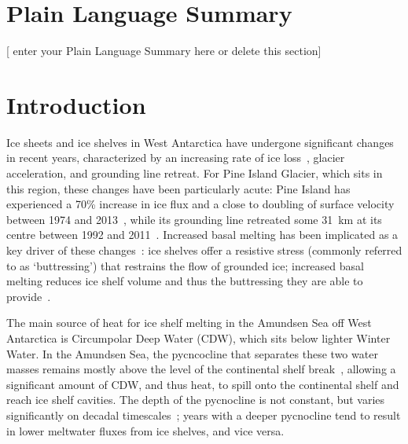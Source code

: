 \documentclass[draft]{agujournal2019}
\begin{document}
\section*{Plain Language Summary}
[ enter your Plain Language Summary here or delete this section]


%
%
\section{Introduction}\label{S:Introduction}

Ice sheets and ice shelves in West Antarctica have undergone significant changes in recent years, characterized by an increasing rate of ice loss~\cite{Paolo2015Science}, glacier acceleration, and grounding line retreat. For Pine Island Glacier, which sits in this region, these changes have been particularly acute: Pine Island has experienced a 70\% increase in ice flux and a close to doubling of surface velocity between 1974 and 2013~\cite{Mouginot2014GRL}, while its grounding line retreated some 31~km at its centre between 1992 and 2011~\cite{Rignot2014GRL}. Increased basal melting has been implicated as a key driver of these changes~\cite{Pritchard2012Nature, Rignot2019PNAS}: ice shelves offer a resistive stress (commonly referred to as `buttressing') that restrains the flow of grounded ice; increased basal melting reduces ice shelf volume and thus the buttressing they are able to provide~\cite{Gudmundsson2013Cryo, Reese2018NatureClimCh, Gudmundsson2019GRL,Gagliardini2010GRL,Goldberg2019GRL}.

The main source of heat for ice shelf melting in the Amundsen Sea off West Antarctica is Circumpolar Deep Water (CDW), which sits below lighter Winter Water. In the Amundsen Sea, the pycncocline that separates these two water masses remains mostly above the level of the continental shelf break~\cite{Heywood2016Oceanography}, allowing a significant amount of CDW, and thus heat, to spill onto the continental shelf and reach ice shelf cavities. The depth of the pycnocline is not constant, but varies significantly on decadal timescales~\cite{Jenkins2018NatureGeo}; years with a deeper pycnocline tend to result in lower meltwater fluxes from ice shelves, and vice versa.
\end{document}
